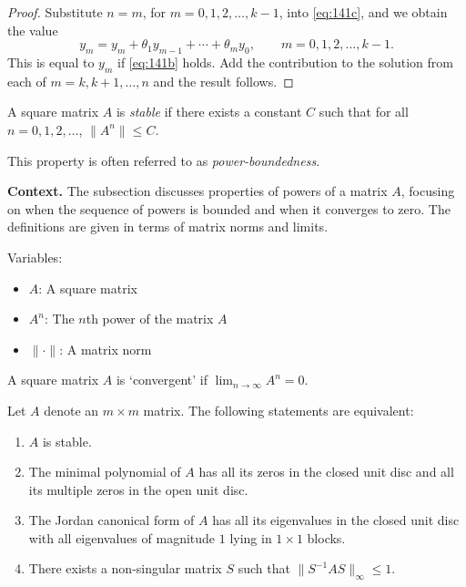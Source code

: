 \begin{proof}
Substitute $n = m$, for $m = 0, 1, 2, \dots, k-1$, into \eqref{eq:141c}, and we obtain the value
\[
y_m = y_m + \theta_1 y_{m-1} + \cdots + \theta_m y_0, \qquad m = 0, 1, 2, \dots, k-1.
\]
This is equal to $y_m$ if \eqref{eq:141b} holds. Add the contribution to the solution from each of $m = k, k+1, \dots, n$ and the result follows.
\end{proof}

\begin{definition}

  \label{def:142A}
  \uses{}
A square matrix $A$ is \emph{stable} if there exists a constant $C$ such that for all $n = 0, 1, 2, \dots$, $\|A^{n}\| \leq C$.

This property is often referred to as \emph{power-boundedness}.
\end{definition}

\noindent\textbf{Context.}
The subsection discusses properties of powers of a matrix $A$, focusing on when the sequence of powers is bounded and when it converges to zero. The definitions are given in terms of matrix norms and limits.

Variables:
\begin{itemize}
    \item $A$: A square matrix
    \item $A^n$: The $n$th power of the matrix $A$
    \item $\|\cdot\|$: A matrix norm
\end{itemize}

\begin{definition}

  \label{def:142B}
A square matrix $A$ is `convergent' if $\lim_{n \to \infty} A^n = 0$.
\end{definition}

\begin{theorem}

  \label{thm:142C}
Let \( A \) denote an \( m \times m \) matrix. The following statements are equivalent:
\begin{enumerate}
\renewcommand{\labelenumi}{(\roman{enumi})}
\item \( A \) is stable.
\item The minimal polynomial of \( A \) has all its zeros in the closed unit disc and all its multiple zeros in the open unit disc.
\item The Jordan canonical form of \( A \) has all its eigenvalues in the closed unit disc with all eigenvalues of magnitude \( 1 \) lying in \( 1 \times 1 \) blocks.
\item There exists a non-singular matrix \( S \) such that \( \| S^{-1} A S \|_{\infty} \leq 1 \).
\end{enumerate}
\end{theorem}


